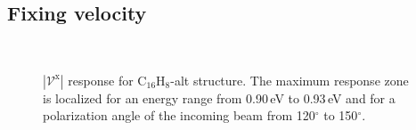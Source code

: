 \documentclass[prb,11pt,tightenlines,twocolumn,aps]{revtex4-1}
\begin{document}

\subsection{Fixing velocity} %
\label{sec:res-fixvel}

\begin{figure}[tb]
    \centering
    \\
    \caption{$|\mathcal{V}^{\mathrm{x}}|$ response for C$_{16}$H$_{8}$-alt
    structure. The maximum response zone is localized for an energy range from
    0.90\,eV to 0.93\,eV and for a polarization angle of the
    incoming beam from 120$^{\circ}$ to 150$^{\circ}$.}
    \label{fig:alt-3d}
\end{figure}
\end{document}
